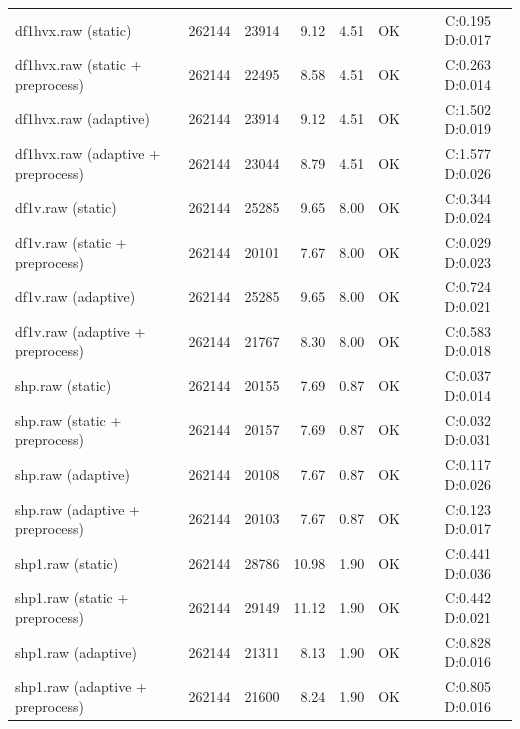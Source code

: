 \documentclass[a4paper,12pt]{article}
\begin{document}
{\begin{tabular}{lrrrrrrr}
            df1hvx.raw (static)                & 262144      & 23914         & 9.12      & 4.51    & OK  & C:0.195 D:0.017 \\
            df1hvx.raw (static + preprocess)   & 262144      & 22495         & 8.58      & 4.51    & OK  & C:0.263 D:0.014 \\
            df1hvx.raw (adaptive)              & 262144      & 23914         & 9.12      & 4.51    & OK  & C:1.502 D:0.019 \\
            df1hvx.raw (adaptive + preprocess) & 262144      & 23044         & 8.79      & 4.51    & OK  & C:1.577 D:0.026 \\
            df1v.raw (static)                  & 262144      & 25285         & 9.65      & 8.00    & OK  & C:0.344 D:0.024 \\
            df1v.raw (static + preprocess)     & 262144      & 20101         & 7.67      & 8.00    & OK  & C:0.029 D:0.023 \\
            df1v.raw (adaptive)                & 262144      & 25285         & 9.65      & 8.00    & OK  & C:0.724 D:0.021 \\
            df1v.raw (adaptive + preprocess)   & 262144      & 21767         & 8.30      & 8.00    & OK  & C:0.583 D:0.018 \\
            shp.raw (static)                   & 262144      & 20155         & 7.69      & 0.87    & OK  & C:0.037 D:0.014 \\
            shp.raw (static + preprocess)      & 262144      & 20157         & 7.69      & 0.87    & OK  & C:0.032 D:0.031 \\
            shp.raw (adaptive)                 & 262144      & 20108         & 7.67      & 0.87    & OK  & C:0.117 D:0.026 \\
            shp.raw (adaptive + preprocess)    & 262144      & 20103         & 7.67      & 0.87    & OK  & C:0.123 D:0.017 \\
            shp1.raw (static)                  & 262144      & 28786         & 10.98     & 1.90    & OK  & C:0.441 D:0.036 \\
            shp1.raw (static + preprocess)     & 262144      & 29149         & 11.12     & 1.90    & OK  & C:0.442 D:0.021 \\
            shp1.raw (adaptive)                & 262144      & 21311         & 8.13      & 1.90    & OK  & C:0.828 D:0.016 \\
            shp1.raw (adaptive + preprocess)   & 262144      & 21600         & 8.24      & 1.90    & OK  & C:0.805 D:0.016 \\

\end{tabular}}
\end{document}
